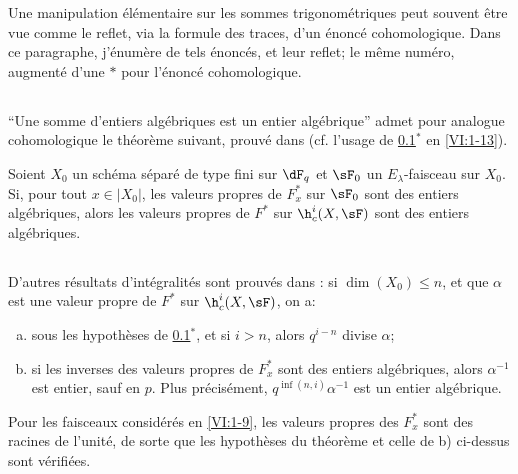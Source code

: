 Une manipulation élémentaire sur les sommes trigonométriques peut souvent 
être vue comme le reflet, via la formule des traces, d'un énoncé 
cohomologique. Dans ce paragraphe, j'énumère de tels énoncés, et leur 
reflet;  le même numéro, augmenté d'une $\ast$ pour 
l'énoncé cohomologique. 





\subsection{}\label{VI:2-1}

``Une somme d'entiers algébriques est un entier algébrique'' admet pour 
analogue cohomologique le théorème suivant, prouvé dans 
\cite[XXI 5.2.2]{sga7} (cf. l'usage de \ref{VI:2-1}$^\ast$ en 
\ref{VI:1-13}). 





\begin{theorem*}[2.1*]\label{VI:2-1*}
Soient $X_0$ un schéma séparé de type fini sur $\dF_q$ et $\sF_0$ un 
$E_\lambda$-faisceau sur $X_0$. Si, pour tout $x\in |X_0|$, les valeurs 
propres de $F_x^\ast$ sur $\sF_0$ sont des entiers algébriques, alors les 
valeurs propres de $F^\ast$ sur $\h_c^i(X,\sF)$ sont des entiers algébriques. 
\end{theorem*}





\subsection{}\label{VI:2-2}

D'autres résultats d'intégralités sont prouvés dans 
\cite[XXI, 5.2.2 et 5.4]{sga7}: si $\dim(X_0)\leqslant n$, et que $\alpha$ est 
une valeur propre de $F^\ast$ sur $\h_c^i(X,\sF)$, on a: 
\begin{enumerate}[a)]
  \item sous les hypothèses de \ref{VI:2-1}$^\ast$, et si $i>n$, alors 
    $q^{i-n}$ divise $\alpha$;
  \item si les inverses des valeurs propres de $F_x^\ast$ sont des entiers 
    algébriques, alors $\alpha^{-1}$ est entier, sauf en $p$. Plus 
    précisément, $q^{\inf(n,i)}\alpha^{-1}$ est un entier algébrique. 
\end{enumerate}

Pour les faisceaux considérés en \ref{VI:1-9}, les valeurs propres des 
$F_x^\ast$ sont des racines de l'unité, de sorte que les hypothèses du 
théorème et celle de b) ci-dessus sont vérifiées. 






